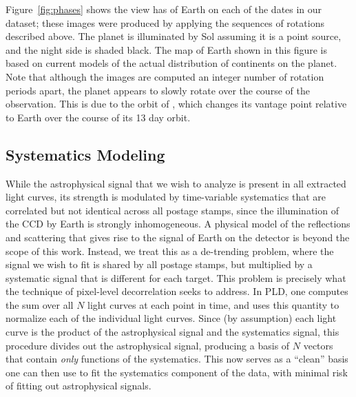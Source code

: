 \documentclass[modern]{aastex62}
\begin{document}
Figure~\ref{fig:phases} shows the view \TESS has of Earth on each of the dates
in our dataset; these images were produced by applying the sequences of rotations
described above. The planet is illuminated by Sol assuming it is a point source,
and the night side is shaded black. The map of Earth shown in this figure is 
based on current models of the actual distribution of continents on the planet.
Note that although the images are computed an integer number of rotation periods
apart, the planet appears to slowly rotate over the course of the observation.
This is due to the orbit of \TESS, which changes its vantage point relative
to Earth over the course of its 13 day orbit.

\subsection{Systematics Modeling}
\label{sec:systematics}

While the astrophysical signal that we wish to analyze is present in all 
extracted light curves, its strength is modulated by time-variable systematics 
that are correlated but not identical across all postage stamps, since the
illumination of the CCD by Earth is strongly inhomogeneous. A physical
model of the reflections and scattering that gives rise to the
signal of Earth on the \TESS detector is beyond the scope of this work. Instead,
we treat this as a de-trending problem, where the signal we wish to fit is
shared by all postage stamps, but multiplied by a systematic signal that is
different for each target. This problem is precisely what the technique of
pixel-level decorrelation \citep[PLD;][]{Deming2015, Luger2016, Luger2018a}
seeks to address. In PLD, one computes the sum over all $N$ light curves at each
point in time, and uses this quantity to normalize each of the individual
light curves. Since (by assumption) each light curve is the product of the astrophysical
signal and the systematics signal, this procedure divides out the astrophysical
signal, producing a basis of $N$ vectors that contain \emph{only} functions of the
systematics. This now serves as a ``clean'' basis one can then use to fit the 
systematics component of the data, with minimal risk of fitting out astrophysical signals. 
\end{document}
